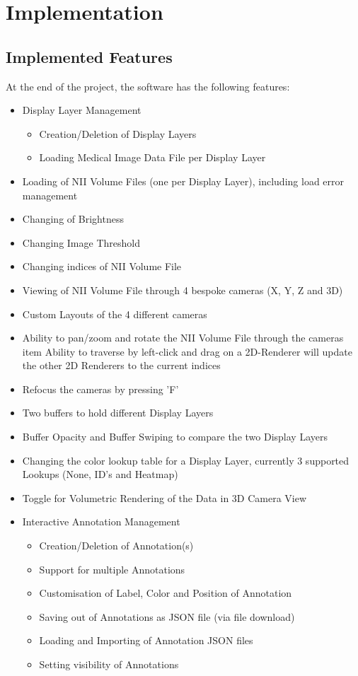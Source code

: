 \documentclass[a4paper,11pt,titlepage]{article}
\begin{document}
\section{Implementation}

\subsection{Implemented Features}

At the end of the project, the software has the following features:

\begin{itemize}
\item Display Layer Management

  \begin{itemize}
  \item Creation/Deletion of Display Layers
  \item Loading Medical Image Data File per Display Layer
  \end{itemize}

\item Loading of NII Volume Files (one per Display Layer), including load error management	
\item Changing of Brightness
\item Changing Image Threshold
\item Changing indices of NII Volume File
\item Viewing of NII Volume File through 4 bespoke cameras (X, Y, Z and 3D)
\item Custom Layouts of the 4 different cameras
\item Ability to pan/zoom and rotate the NII Volume File through the cameras
  item Ability to traverse by left-click and drag on a 2D-Renderer will update the other 2D Renderers to the current indices
\item Refocus the cameras by pressing 'F'
\item Two buffers to hold different Display Layers
\item Buffer Opacity and Buffer Swiping to compare the two Display Layers
\item Changing the color lookup table for a Display Layer, currently 3 supported Lookups (None, ID's and Heatmap)
\item Toggle for Volumetric Rendering of the Data in 3D Camera View
\item Interactive Annotation Management

  \begin{itemize}
  \item Creation/Deletion of Annotation(s)
  \item Support for multiple Annotations
  \item Customisation of Label, Color and Position of Annotation
  \item Saving out of Annotations as JSON file (via file download)
  \item Loading and Importing of Annotation JSON files
  \item Setting visibility of Annotations
  \end{itemize}


\end{itemize}
\end{document}
